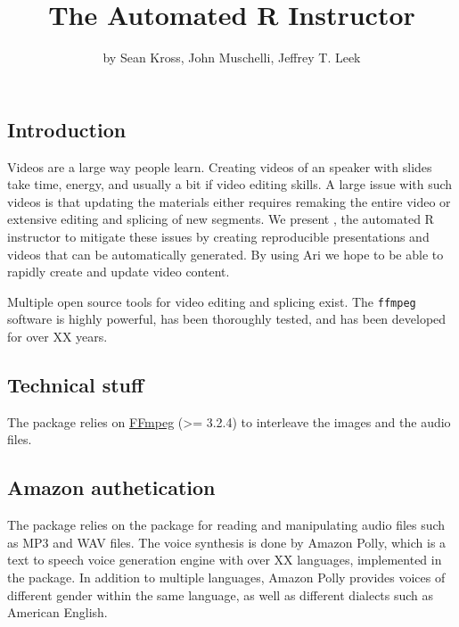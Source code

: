 \title{The Automated R Instructor}
\author{by Sean Kross, John Muschelli, Jeffrey T. Leek}

\maketitle



\hypertarget{introduction}{%
\subsection{Introduction}\label{introduction}}

Videos are a large way people learn. Creating videos of an speaker with
slides take time, energy, and usually a bit if video editing skills. A
large issue with such videos is that updating the materials either
requires remaking the entire video or extensive editing and splicing of
new segments. We present , the automated R instructor to
mitigate these issues by creating reproducible presentations and videos
that can be automatically generated. By using Ari we hope to be able to
rapidly create and update video content.

Multiple open source tools for video editing and splicing exist. The
\texttt{ffmpeg} software is highly powerful, has been thoroughly tested,
and has been developed for over XX years.

\hypertarget{technical-stuff}{%
\subsection{Technical stuff}\label{technical-stuff}}

The  package relies on \href{https://ffmpeg.org/}{FFmpeg}
(\textgreater{}= 3.2.4) to interleave the images and the audio files.

\hypertarget{amazon-authetication}{%
\subsection{Amazon authetication}\label{amazon-authetication}}

The  package relies on the  package for reading
and manipulating audio files such as MP3 and WAV files. The voice
synthesis is done by Amazon Polly, which is a text to speech voice
generation engine with over XX languages, implemented in the
 package. In addition to multiple languages, Amazon
Polly provides voices of different gender within the same language, as
well as different dialects such as American English.

